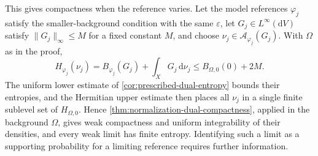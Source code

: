 This gives compactness when the reference varies. Let the model references $\varphi_j$ satisfy the smaller-background condition with the same $\varepsilon$, let $G_j\in L^\infty(\mathrm{d}V)$ satisfy $\|G_j\|_\infty\leq M$ for a fixed constant $M$, and choose $\nu_j\in\mathcal A_{\varphi_j}(G_j)$. With $\Omega$ as in the proof,
\[
 H_{\varphi_j}(\nu_j)
 =B_{\varphi_j}(G_j)+\int_XG_j\,\mathrm{d}\nu_j
 \leq B_{\Omega,0}(0)+2M.
\]
The uniform lower estimate of \cref{cor:prescribed-dual-entropy} bounds their entropies, and the Hermitian upper estimate then places all $\nu_j$ in a single finite sublevel set of $H_{\Omega,0}$. Hence \cref{thm:normalization-dual-compactness}, applied in the background $\Omega$, gives weak compactness and uniform integrability of their densities, and every weak limit has finite entropy. Identifying such a limit as a supporting probability for a limiting reference requires further information.

